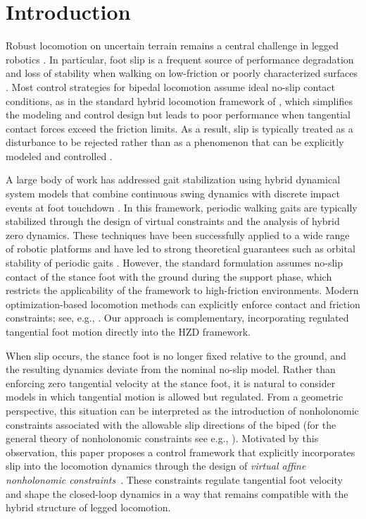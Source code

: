\documentclass[letterpaper, 10 pt, conference]{ieeeconf}
\begin{document}
\section{Introduction}

Robust locomotion on uncertain terrain remains a central challenge in legged robotics \cite{dosunmu2024demonstrating, verhagen2022human, siekmann2021blind}.
In particular, foot slip is a frequent source of performance degradation and loss of stability when walking on low-friction or poorly characterized surfaces \cite{kaneko2005slip, chen2016balance}.
Most control strategies for bipedal locomotion assume ideal no-slip contact conditions, as in the standard hybrid locomotion framework of \cite{Westervelt2007}, which simplifies the modeling and control design but leads to poor performance when tangential contact forces exceed the friction limits. As a result, slip is typically treated as a disturbance to be rejected rather than as a phenomenon that can be explicitly modeled and controlled \cite{kaneko2005slip}.

A large body of work has addressed gait stabilization using hybrid dynamical system models that combine continuous swing dynamics with discrete impact events at foot touchdown \cite{Westervelt2007, ames2012first}.
In this framework, periodic walking gaits are typically stabilized through the design of virtual constraints and the analysis of hybrid zero dynamics.
These techniques have been successfully applied to a wide range of robotic platforms and have led to strong theoretical guarantees such as orbital stability of periodic gaits \cite{Grizzle2018}.
However, the standard formulation assumes no-slip contact of the stance foot with the ground during the support phase, which restricts the applicability of the framework to high-friction environments. Modern optimization-based locomotion methods can explicitly enforce
contact and friction constraints; see, e.g., \cite{hereid2018dynamic}.
Our approach is complementary, incorporating regulated tangential
foot motion directly into the HZD framework.

When slip occurs, the stance foot is no longer fixed relative to the ground, and the resulting dynamics deviate from the nominal no-slip model. Rather than enforcing zero tangential velocity at the stance foot, it is natural to consider models in which tangential motion is allowed but regulated.
From a geometric perspective, this situation can be interpreted as the introduction of nonholonomic constraints associated with the allowable slip directions of the biped (for the general theory of nonholonomic constraints see
e.g., \cite{Bloch2003}).
Motivated by this observation, this paper proposes a control framework that explicitly incorporates slip into the locomotion dynamics through the design of \emph{virtual affine nonholonomic constraints}~\cite{stratoglou2023virtual}.
These constraints regulate tangential foot velocity and shape the closed-loop dynamics in a way that remains compatible with the hybrid structure of legged locomotion.
\end{document}
